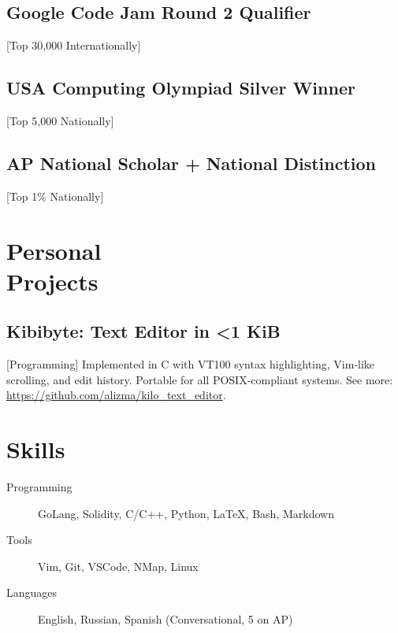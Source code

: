 \documentclass{mycv}
\begin{document}
\subsection{Google Code Jam Round 2 Qualifier}[Top 30,000 Internationally]

\subsection{USA Computing Olympiad Silver Winner}[Top 5,000 Nationally]

\subsection{AP National Scholar + National Distinction}[Top 1\% Nationally]

\section{Personal \\ Projects} 

\subsection{Kibibyte: Text Editor in <1 KiB}[Programming]
Implemented in C with VT100 syntax highlighting, Vim-like scrolling, and edit history. Portable for all POSIX-compliant systems. See more: \url{https://github.com/alizma/kilo_text_editor}.

\section{Skills}

\begin{description}
  \item[Programming] GoLang, Solidity, C/C++, Python, \LaTeX, Bash, Markdown
  \item[Tools] Vim, Git, VSCode, NMap, Linux
  \item[Languages] English, Russian, Spanish (Conversational, 5 on AP)
\end{description}
\end{document}
